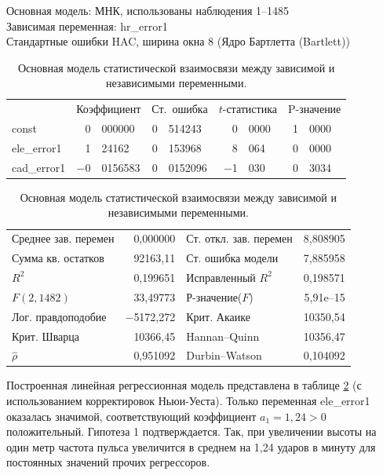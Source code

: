 \documentclass[a4paper,12pt]{article}
\begin{document}
\begin{table}[H]
\begin{center}
	
	Основная модель: МНК, использованы наблюдения 1--1485\\
	Зависимая переменная: hr\_error1\\
	Стандартные ошибки HAC, ширина окна 8 (Ядро Бартлетта (Bartlett))
	
	\vspace{1em}
	
	\begin{tabular}{lr@{,}lr@{,}lr@{,}lr@{,}l}
		&
		\multicolumn{2}{c}{Коэффициент} &
		\multicolumn{2}{c}{Ст.\ ошибка} &
		\multicolumn{2}{c}{$t$-статистика} &
		\multicolumn{2}{c}{P-значение} \\[1ex]
		const &
		0&000000 &
		0&514243 &
		0&0000 &
		1&0000 \\
		ele\_error1 &
		1&24162 &
		0&153968 &
		8&064 &
		0&0000 \\
		cad\_error1 &
		$-$0&0156583 &
		0&0152096 &
		$-$1&030 &
		0&3034 \\
	\end{tabular}
	
	\vspace{1ex}
	\begin{tabular}{lrlr}
		Среднее зав. перемен &  0,000000 & Ст. откл. зав. перемен &  8,808905 \\
		Сумма кв. остатков &  92163,11 & Ст. ошибка модели &  7,885958 \\
		$R^2$ &  0,199651 & Исправленный $R^2$ &  0,198571 \\
		$F(2, 1482)$ &  33,49773 & Р-значение($F$) &  5,91\textrm{e--15} \\
		Лог. правдоподобие & $-$5172,272 & Крит. Акаике &  10350,54 \\
		Крит. Шварца &  10366,45 & Hannan--Quinn &  10356,47 \\
		$\hat{\rho}$ &  0,951092 & Durbin--Watson &  0,104092 \\
	\end{tabular}
\end{center}
\caption{Основная модель статистической взаимосвязи между зависимой и независимыми переменными.}
\label{tab:table3}
\end{table}

Построенная линейная регрессионная модель представлена в таблице \ref{tab:table3} (с использованием корректировок Ньюи-Уеста). Только переменная ele\_error1 оказалась значимой, соответствующий коэффициент $a_1 = 1,24 > 0$ положительный. Гипотеза 1 подтверждается. Так, при увеличении высоты на один метр частота пульса увеличится в среднем на 1,24 ударов в минуту для постоянных значений прочих регрессоров.
\end{document}
